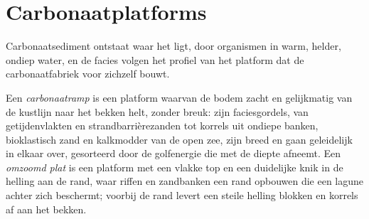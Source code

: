 \section{Carbonaatplatforms}\label{sec:b3:facies-models:carbonates}

Carbonaatsediment ontstaat waar het ligt, door organismen in warm, helder,
ondiep water, en de facies volgen het profiel van het platform dat de
carbonaatfabriek voor zichzelf bouwt.

\begin{definition}\label{def:b3:facies-models:ramp}
Een \emph{carbonaatramp} is een platform waarvan de bodem
zacht en gelijkmatig van de kustlijn naar het bekken helt, zonder breuk:
zijn faciesgordels, van getijdenvlakten en strandbarrièrezanden tot korrels uit ondiepe banken,
bioklastisch zand en kalkmodder van de open zee, zijn breed en gaan geleidelijk in
elkaar over, gesorteerd door de golfenergie die met de diepte afneemt. Een \emph{omzoomd
plat} is een platform met een vlakke top en een duidelijke knik
in de helling aan de rand, waar riffen en zandbanken een rand opbouwen die
een lagune achter zich beschermt; voorbij de rand levert een steile helling blokken en korrels af aan
het bekken.
\end{definition}


